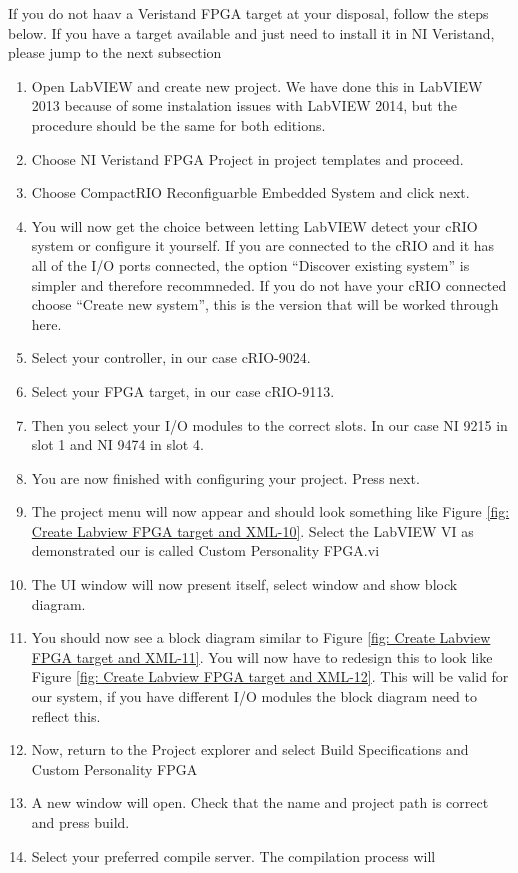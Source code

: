 \documentclass[a4paper,twoside,english]{report}
\begin{document}
If you do not haav a Veristand FPGA target at your disposal, follow
the steps below. If you have a target available and just need to install
it in NI Veristand, please jump to the next subsection
\begin{enumerate}
\item Open LabVIEW and create new project. We have done this in LabVIEW
2013 because of some instalation issues with LabVIEW 2014, but the
procedure should be the same for both editions.
\item Choose NI Veristand FPGA Project in project templates and proceed.
\item Choose CompactRIO Reconfiguarble Embedded System and click next.
\item You will now get the choice between letting LabVIEW detect your cRIO
system or configure it yourself. If you are connected to the cRIO
and it has all of the I/O ports connected, the option ``Discover
existing system'' is simpler and therefore recommneded. If you do
not have your cRIO connected choose ``Create new system'', this
is the version that will be worked through here.
\item Select your controller, in our case cRIO-9024.
\item Select your FPGA target, in our case cRIO-9113.
\item Then you select your I/O modules to the correct slots. In our case
NI 9215 in slot 1 and NI 9474 in slot 4.
\item You are now finished with configuring your project. Press next.
\item The project menu will now appear and should look something like Figure
\ref{fig: Create Labview FPGA target and XML-10}. Select the LabVIEW
VI as demonstrated our is called Custom Personality FPGA.vi
\item The UI window will now present itself, select window and show block
diagram.
\item You should now see a block diagram similar to Figure \ref{fig: Create Labview FPGA target and XML-11}.
You will now have to redesign this to look like Figure \ref{fig: Create Labview FPGA target and XML-12}.
This will be valid for our system, if you have different I/O modules
the block diagram need to reflect this.
\item Now, return to the Project explorer and select Build Specifications
and Custom Personality FPGA
\item A new window will open. Check that the name and project path is correct
and press build.
\item Select your preferred compile server. The compilation process will

\end{enumerate}
\end{document}
